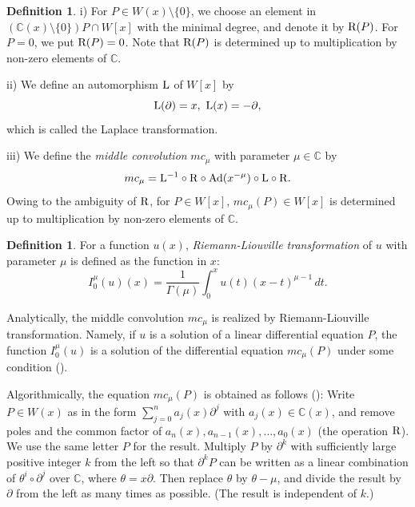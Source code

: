 \documentclass[a4paper,12pt]{article}
\theoremstyle{definition}
\newtheorem{dfn}[thm]{Definition}
\theoremstyle{remark}
\numberwithin{equation}{section} %
\newcommand{\blue}[1]{\textcolor{black}{#1}}
\begin{document}
\begin{dfn}\label{defmc}\label{GenAddMid}
i)
For $P\in W(x)\setminus\{0\}$, we choose an element in
$(\mathbb{C}(x)\setminus\{0\})P\cap W[x]$ with the minimal degree,
and denote it by ${\rm R}(P)$.
For $P=0$, we put ${\rm R}(P)=0$.
Note that ${\rm R}(P)$ is determined up to multiplication by non-zero elements of $\mathbb{C}$.

\par\noindent
ii)
We define an automorphism ${\rm L}$ of $W[x]$ by
$$
 {\rm L}(\partial)=x,\  {\rm L}(x)=-\partial,
$$
which is called the Laplace transformation.

\par\noindent
iii)
We define the {\it middle convolution} $mc_{\mu}$ with parameter $\mu\in\mathbb{C}$ by
$$
 mc_{\mu}={\rm L}^{-1}\circ{\rm R}\circ{\rm Ad}(x^{-\mu})\circ{\rm L}\circ{\rm R}.
$$
Owing to the ambiguity of ${\rm R}$, for $P\in W[x]$, $mc_{\mu}(P)\in W[x]$ is determined
up to multiplication by non-zero elements of $\mathbb{C}$.
\end{dfn}

\begin{dfn}\label{GenAddRL}
  For a function $u(x)$, {\it Riemann-Liouville transformation} of $u$
  with parameter $\mu$ is defined as the function in $x$:
 $$I^{\mu}_{0}(u)(x)=\frac1{\Gamma(\mu)}\int_0^x u(t)(x-t)^{\mu-1}\, dt.$$
\end{dfn}

Analytically, the middle convolution $mc_{\mu}$ is realized by Riemann-Liouville transformation.
Namely,
if $u$ is a solution of a linear differential equation $P$,
the function $I^{\mu}_{0}(u)$ is a solution of
the differential equation $mc_{\mu}(P)$ under some condition (\cite[Theorem 4.2]{Oshi2}).

\medskip   
Algorithmically,
the equation $mc_{\mu}(P)$ is obtained as follows (\cite{Osh,Oshi2,Hara}):
Write $P\in  W(x)$ as in the form $\sum_{j=0}^na_j(x)\partial^j$ with $a_j(x)\in\mathbb{C}(x)$,
and remove poles and the common factor of $a_n(x),a_{n-1}(x),\dots,\allowbreak a_0(x)$ (the operation ${\rm R}$).
We use the same letter $P$ for the result.
 Multiply $P$ by $\partial^k$ with sufficiently large positive integer $k$
 from the left so that $\partial^kP$ can be written
 as a linear combination of $\theta^i\circ\partial^j$ over $\mathbb{C}$, where $\theta=x\partial$.
Then replace $\theta$ by $\theta-\mu$, and divide the result by $\partial$
from the left as many times as possible.
 (The result is independent of $k$.) 
\end{document}
